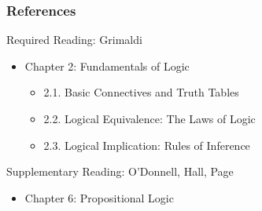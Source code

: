 \documentclass[dvipsnames]{beamer}
\begin{document}
\begin{frame}
  \frametitle{References}

  \begin{block}{Required Reading: Grimaldi}
    \begin{itemize}
      \item Chapter 2: Fundamentals of Logic
      \begin{itemize}
        \item 2.1. \alert{Basic Connectives and Truth Tables}
        \item 2.2. \alert{Logical Equivalence: The Laws of Logic}\\
        \item 2.3. \alert{Logical Implication: Rules of Inference}
      \end{itemize}
    \end{itemize}
  \end{block}

  \begin{block}{Supplementary Reading: O'Donnell, Hall, Page}
    \begin{itemize}
      \item Chapter 6: Propositional Logic
    \end{itemize}
  \end{block}
\end{frame}
\end{document}
